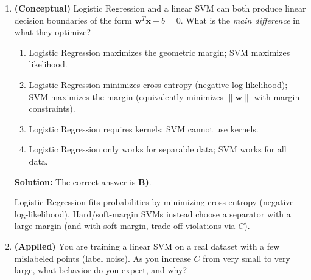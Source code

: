 \documentclass{article}
\begin{document}
\begin{enumerate}
\textbf{Solution:} The correct answer is \(\textbf{b) } K(\mathbf{x}_i,\mathbf{x}_j) = (\mathbf{x}_i^T \mathbf{x}_j + 1)^2\).

To see why this is true, consider the expansion:
\begin{align*}
\phi(\mathbf{x}_i)^T \phi(\mathbf{x}_j) &= x_{i1}^2x_{j1}^2 + \sqrt{2}x_{i1}x_{i2}\sqrt{2}x_{j1}x_{j2} + x_{i2}^2x_{j2}^2 + \sqrt{2}x_{i1}\sqrt{2}x_{j1} + \sqrt{2}x_{i2}\sqrt{2}x_{j2} + 1 \\
&= x_{i1}^2x_{j1}^2 + 2x_{i1}x_{i2}x_{j1}x_{j2} + x_{i2}^2x_{j2}^2 + 2x_{i1}x_{j1} + 2x_{i2}x_{j2} + 1 \\
&= (x_{i1}x_{j1} + x_{i2}x_{j2} + 1)^2 \\
&= (\mathbf{x}_i^T \mathbf{x}_j + 1)^2
\end{align*}

Notice that \(K(\mathbf{x}_i, \mathbf{x}_j)\) is much easier to compute directly than computing the dot product of the transformed vectors separately.


\item \textbf{(Conceptual)} Logistic Regression and a linear SVM can both produce linear decision boundaries
of the form $\mathbf{w}^T\mathbf{x}+b=0$. What is the \emph{main difference} in what they optimize?

\begin{enumerate}
    \item Logistic Regression maximizes the geometric margin; SVM maximizes likelihood.
    \item Logistic Regression minimizes cross-entropy (negative log-likelihood); SVM maximizes the margin (equivalently minimizes $\|\mathbf{w}\|$ with margin constraints).
    \item Logistic Regression requires kernels; SVM cannot use kernels.
    \item Logistic Regression only works for separable data; SVM works for all data.
\end{enumerate}

\textbf{Solution:} The correct answer is \textbf{B)}.

Logistic Regression fits probabilities by minimizing cross-entropy (negative log-likelihood).
Hard/soft-margin SVMs instead choose a separator with a large margin (and with soft margin, trade off violations via $C$).


\item \textbf{(Applied)} You are training a linear SVM on a real dataset with a few mislabeled points (label noise).
As you increase $C$ from very small to very large, what behavior do you expect, and why?


\end{enumerate}
\end{document}
